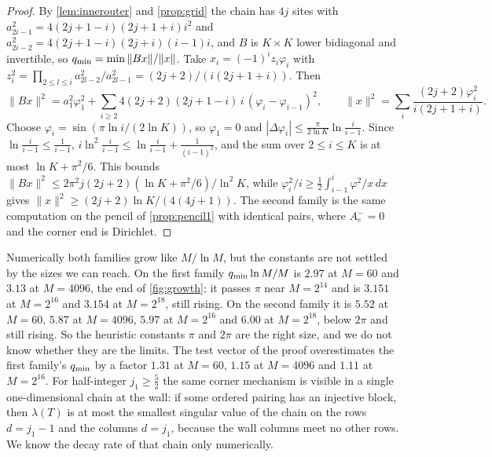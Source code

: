 \begin{proof}
By \cref{lem:innerouter} and \cref{prop:grid} the chain has $4j$ sites with
$a_{2i-1}^2=4(2j+1-i)(2j+1+i)i^2$ and $a_{2i-2}^2=4(2j+1-i)(2j+i)(i-1)i$, and $B$ is
$K\times K$ lower bidiagonal and invertible, so $q_{\min}=\min\|Bx\|/\|x\|$. Take
$x_i=(-1)^iz_i\varphi_i$ with $z_i^2=\prod_{2\le l\le i}a_{2l-2}^2/a_{2l-1}^2=(2j+2)/(i(2j+1+i))$. Then
\[
  \|Bx\|^2=a_1^2\varphi_1^2+\sum_{i\ge2}4(2j+2)(2j+1-i)\,i\,(\varphi_i-\varphi_{i-1})^2,\qquad
  \|x\|^2=\sum_i\frac{(2j+2)\varphi_i^2}{i(2j+1+i)}.
\]
Choose $\varphi_i=\sin(\pi\ln i/(2\ln K))$, so $\varphi_1=0$ and $|\Delta\varphi_i|\le
\frac{\pi}{2\ln K}\ln\frac{i}{i-1}$. Since $\ln\frac i{i-1}\le\frac1{i-1}$,
$i\ln^2\frac i{i-1}\le\ln\frac i{i-1}+\frac1{(i-1)^2}$, and the sum over $2\le i\le K$
is at most $\ln K+\pi^2/6$. This bounds $\|Bx\|^2\le2\pi^2j(2j+2)(\ln K+\pi^2/6)/\ln^2K$,
while $\varphi_i^2/i\ge\frac12\int_{i-1}^i\varphi^2/x\,dx$ gives $\|x\|^2\ge(2j+2)\ln K/(4(4j+1))$.
The second family is the same computation on the pencil of \cref{prop:pencil1} with
identical pairs, where $A^-_e=0$ and the corner end is Dirichlet.
\end{proof}

Numerically both families grow like $M/\ln M$, but the constants are not settled by the
sizes we can reach. On the first family $q_{\min}\ln M/M$ is $2.97$ at $M=60$ and $3.13$ at
$M=4096$, the end of \cref{fig:growth}; it passes $\pi$ near $M=2^{14}$ and is $3.151$ at
$M=2^{16}$ and $3.154$ at $M=2^{18}$, still rising. On the second family it is $5.52$ at
$M=60$, $5.87$ at $M=4096$, $5.97$ at $M=2^{16}$ and $6.00$ at $M=2^{18}$, below $2\pi$ and
still rising. So the heuristic constants $\pi$ and $2\pi$ are the right size, and we do not
know whether they are the limits. The test vector of the proof overestimates the first
family's $q_{\min}$ by a factor $1.31$ at $M=60$, $1.15$ at $M=4096$ and $1.11$ at $M=2^{16}$. For half-integer $j_1\ge\frac52$ the same corner mechanism is visible in a single
one-dimensional chain at the wall: if some ordered pairing has an injective block, then
$\lambda(T)$ is at most the smallest singular value of the chain on the rows $d=j_1-1$
and the columns $d=j_1$, because the wall columns meet no other rows. We know the
decay rate of that chain only numerically.
